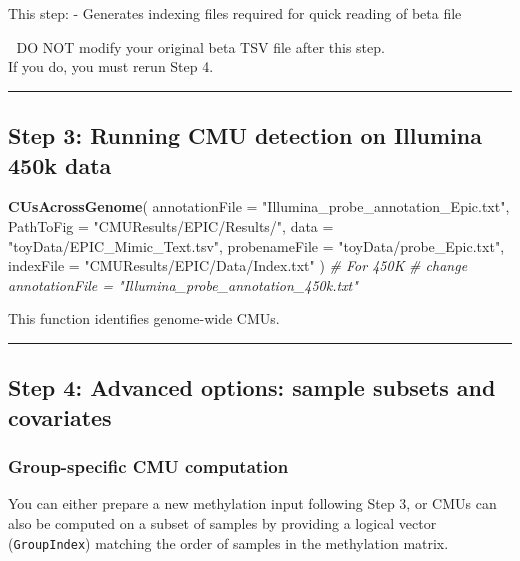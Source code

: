 \documentclass[
]{article}
\newenvironment{Shaded}{\begin{snugshade}}{\end{snugshade}}
\newcommand{\AttributeTok}[1]{\textcolor[rgb]{0.13,0.29,0.53}{#1}}
\newcommand{\CommentTok}[1]{\textcolor[rgb]{0.56,0.35,0.01}{\textit{#1}}}
\newcommand{\FunctionTok}[1]{\textcolor[rgb]{0.13,0.29,0.53}{\textbf{#1}}}
\newcommand{\NormalTok}[1]{#1}
\newcommand{\StringTok}[1]{\textcolor[rgb]{0.31,0.60,0.02}{#1}}
\begin{document}
This step: - Generates indexing files required for quick reading of beta
file

🛑 DO NOT modify your original beta TSV file after this step.\\
If you do, you must rerun Step 4.

\begin{center}\rule{0.5\linewidth}{0.5pt}\end{center}

\subsection{Step 3: Running CMU detection on Illumina 450k
data}\label{step3-CMU-calling}

\begin{Shaded}
\begin{Highlighting}[]
\FunctionTok{CUsAcrossGenome}\NormalTok{(}
  \AttributeTok{annotationFile =} \StringTok{"Illumina\_probe\_annotation\_Epic.txt"}\NormalTok{,}
  \AttributeTok{PathToFig =} \StringTok{"CMUResults/EPIC/Results/"}\NormalTok{,}
  \AttributeTok{data =} \StringTok{"toyData/EPIC\_Mimic\_Text.tsv"}\NormalTok{,}
  \AttributeTok{probenameFile =} \StringTok{"toyData/probe\_Epic.txt"}\NormalTok{,}
  \AttributeTok{indexFile =} \StringTok{"CMUResults/EPIC/Data/Index.txt"}
\NormalTok{)}
\CommentTok{\# For 450K }
\CommentTok{\# change annotationFile = "Illumina\_probe\_annotation\_450k.txt"}
\end{Highlighting}
\end{Shaded}

This function identifies genome-wide CMUs.

\begin{center}\rule{0.5\linewidth}{0.5pt}\end{center}

\subsection{Step 4: Advanced options: sample subsets and
covariates}\label{step4-adj_cov}

\subsubsection{Group-specific CMU
computation}\label{group-specific-cmu-computation}

You can either prepare a new methylation input following Step 3, or CMUs
can also be computed on a subset of samples by providing a logical
vector (\texttt{GroupIndex}) matching the order of samples in the
methylation matrix.
\end{document}
